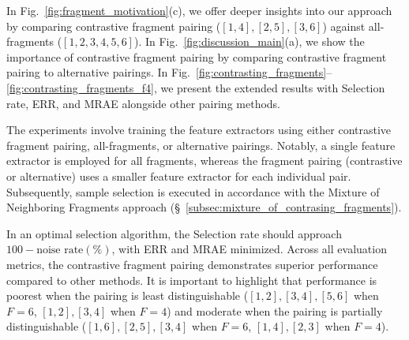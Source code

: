 \documentclass{article}
\theoremstyle{plain}
\theoremstyle{definition}
\theoremstyle{remark}
\begin{document}


In Fig.~\ref{fig:fragment_motivation}(c), we offer deeper insights into our approach by comparing contrastive fragment pairing ($[1,4], [2,5], [3,6]$) against all-fragments ($[1,2,3,4,5,6]$).
In Fig.~\ref{fig:discussion_main}(a), we show the importance of contrastive fragment pairing by comparing contrastive fragment pairing to alternative pairings.
In Fig.~\ref{fig:contrasting_fragments}--\ref{fig:contrasting_fragments_f4}, we present the extended results with Selection rate, ERR, and MRAE alongside other pairing methods. %

The experiments involve training the feature extractors using either contrastive fragment pairing, all-fragments, or alternative pairings.
Notably, a single feature extractor is employed for all fragments, whereas the fragment pairing (contrastive or alternative) uses a smaller feature extractor for each individual pair.
Subsequently, sample selection is executed in accordance with the Mixture of Neighboring Fragments approach (\S~\ref{subsec:mixture_of_contrasing_fragments}).

In an optimal selection algorithm, the Selection rate should approach $100 - \text{noise rate}(\%)$, with ERR and MRAE minimized.
Across all evaluation metrics, the contrastive fragment pairing demonstrates superior performance compared to other methods. 
It is important to highlight that performance is poorest when the pairing is least distinguishable ($[1,2],[3,4],[5,6]$ when $F=6$, $[1,2],[3,4]$ when $F=4$) and moderate when the pairing is partially distinguishable ($[1,6],[2,5],[3,4]$ when $F=6$, $[1,4], [2,3]$ when $F=4$).
\end{document}
